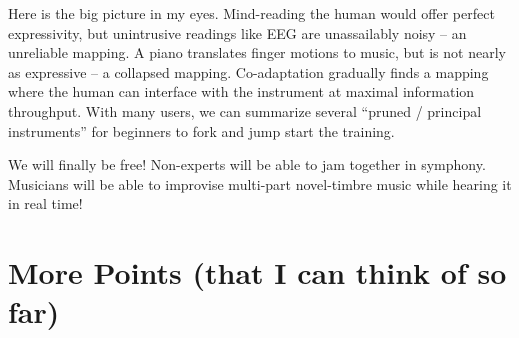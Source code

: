 \documentclass{article}
\begin{document}
Here is the big picture in my eyes. Mind-reading the human would offer perfect expressivity, but unintrusive readings like EEG are unassailably noisy – an unreliable mapping. A piano translates finger motions to music, but is not nearly as expressive – a collapsed mapping. Co-adaptation gradually finds a mapping where the human can interface with the instrument at maximal information throughput. With many users, we can summarize several “pruned / principal instruments” for beginners to fork and jump start the training. 

We will finally be free! Non-experts will be able to jam together in symphony. Musicians will be able to improvise multi-part novel-timbre music while hearing it in real time! 

\section{More Points (that I can think of so far)}
\end{document}
